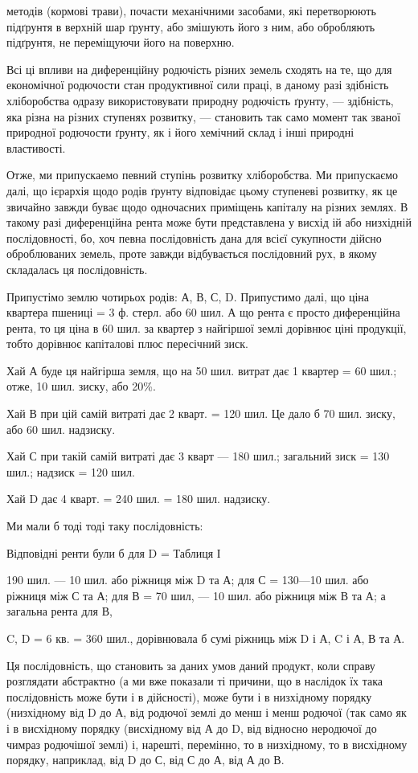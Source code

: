 методів (кормові трави), почасти механічними засобами, які перетворюють
підґрунтя в верхній шар ґрунту, або змішують його з ним, або обробляють підґрунтя,
не переміщуючи його на поверхню.

Всі ці впливи на диференційну родючість різних земель сходять на те, що для
економічної родючости стан продуктивної сили праці, в даному разі здібність хліборобства
одразу використовувати природну родючість ґрунту, — здібність, яка різна
на різних ступенях розвитку, — становить так само момент так званої природної
родючости ґрунту, як і його хемічний склад і інші природні властивості.

Отже, ми припускаемо певний ступінь розвитку хліборобства. Ми припускаємо
далі, що ієрархія щодо родів ґрунту відповідає цьому ступеневі розвитку,
як це звичайно завжди буває щодо одночасних приміщень капіталу на різних
землях. В такому разі диференційна рента може бути представлена у висхід ій
або низхідній послідовності, бо, хоч певна послідовність дана для всієї сукупности
дійсно оброблюваних земель, проте завжди відбувається послідовний рух,
в якому складалась ця послідовність.

Припустімо землю чотирьох родів: А, В, С, D. Припустимо далі, що ціна
квартера пшениці = 3 ф. стерл. або 60 шил. А що рента є просто диференційна рента,
то ця ціна в 60 шил. за квартер з найгіршої землі дорівнює ціні продукції,
тобто дорівнює капіталові плюс пересічний зиск.

Хай А буде ця найгірша земля, що на 50 шил. витрат дає 1 квартер = 60
шил.; отже, 10 шил. зиску, або 20\%.

Хай В при цій самій витраті дає 2 кварт. = 120 шил. Це дало б 70 шил.
зиску, або 60 шил. надзиску.

Хай С при такій самій витраті дає 3 кварт — 180 шил.; загальний
зиск = 130 шил.; надзиск = 120 шил.

Хай D дає 4 кварт. = 240 шил. = 180 шил. надзиску.

Ми мали б тоді тоді таку послідовність:

Відповідні ренти
були б для D = Таблиця І

190 шил. — 10 шил.
або ріжниця між D та
А; для С = 130—10
шил. або ріжниця
між С та А; для
В = 70 шил, — 10
шил. або ріжниця
між В та А; а загальна
рента для В,

C, D = 6 кв. = 360
шил., дорівнювала б
сумі ріжниць між
D і А, C і А, В та А.

Ця послідовність,
що становить за даних умов даний продукт, коли справу розглядати
абстрактно (а ми вже показали ті причини, що в наслідок їх така послідовність
може бути і в дійсності), може бути і в низхідному порядку (низхідному
від D до А, від родючої землі до менш і менш родючої (так само як і в висхідному
порядку (висхідному від А до D, від відносно неродючої до чимраз родючішої землі)
і, нарешті, перемінно, то в низхідному, то в висхідному порядку, наприклад,
від D до С, від С до А, від А до В.

